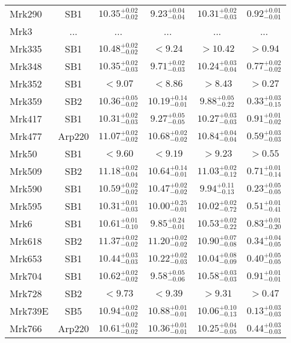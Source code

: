 \documentclass[onecolumn]{mn2e}
\begin{document}
{\begin{center}
\begin{longtable}{lccccc}
Mrk290 & SB1 & $10.35_{-0.02}^{+0.02}$ & $9.23_{-0.04}^{+0.04}$ & $10.31_{-0.03}^{+0.02}$ &$0.92_{-0.01}^{+0.01}$ \\
Mrk3 & ... & ... & ... & ... &... \\
Mrk335 & SB1 & $10.48_{-0.02}^{+0.02}$ & $<9.24$ & $>10.42$ &$>0.94$ \\
Mrk348 & SB1 & $10.35_{-0.03}^{+0.02}$ & $9.71_{-0.03}^{+0.02}$ & $10.24_{-0.04}^{+0.03}$ &$0.77_{-0.02}^{+0.02}$ \\
Mrk352 & SB1 & $<9.07$ & $<8.86$ & $>8.43$ &$>0.27$ \\
Mrk359 & SB2 & $10.36_{-0.02}^{+0.05}$ & $10.19_{-0.01}^{+0.14}$ & $9.88_{-0.22}^{+0.05}$ &$0.33_{-0.15}^{+0.03}$ \\
Mrk417 & SB1 & $10.31_{-0.03}^{+0.02}$ & $9.27_{-0.05}^{+0.05}$ & $10.27_{-0.03}^{+0.03}$ &$0.91_{-0.02}^{+0.01}$ \\
Mrk477 & Arp220 & $11.07_{-0.02}^{+0.02}$ & $10.68_{-0.02}^{+0.02}$ & $10.84_{-0.04}^{+0.04}$ &$0.59_{-0.03}^{+0.03}$ \\
Mrk50 & SB1 & $<9.60$ & $<9.19$ & $>9.23$ &$>0.55$ \\
Mrk509 & SB2 & $11.18_{-0.04}^{+0.02}$ & $10.64_{-0.01}^{+0.14}$ & $11.03_{-0.12}^{+0.02}$ &$0.71_{-0.14}^{+0.01}$ \\
Mrk590 & SB1 & $10.59_{-0.02}^{+0.02}$ & $10.47_{-0.02}^{+0.02}$ & $9.94_{-0.13}^{+0.11}$ &$0.23_{-0.05}^{+0.05}$ \\
Mrk595 & SB1 & $10.31_{-0.03}^{+0.01}$ & $10.00_{-0.01}^{+0.25}$ & $10.02_{-0.72}^{+0.02}$ &$0.51_{-0.41}^{+0.01}$ \\
Mrk6 & SB1 & $10.61_{-0.10}^{+0.01}$ & $9.85_{-0.01}^{+0.24}$ & $10.53_{-0.22}^{+0.02}$ &$0.83_{-0.20}^{+0.01}$ \\
Mrk618 & SB2 & $11.37_{-0.02}^{+0.02}$ & $11.20_{-0.02}^{+0.02}$ & $10.90_{-0.08}^{+0.07}$ &$0.34_{-0.05}^{+0.04}$ \\
Mrk653 & SB1 & $10.44_{-0.03}^{+0.03}$ & $10.22_{-0.03}^{+0.02}$ & $10.04_{-0.09}^{+0.08}$ &$0.40_{-0.05}^{+0.05}$ \\
Mrk704 & SB1 & $10.62_{-0.02}^{+0.02}$ & $9.58_{-0.06}^{+0.05}$ & $10.58_{-0.03}^{+0.03}$ &$0.91_{-0.01}^{+0.01}$ \\
Mrk728 & SB2 & $<9.73$ & $<9.39$ & $>9.31$ &$>0.47$ \\
Mrk739E & SB5 & $10.94_{-0.02}^{+0.02}$ & $10.88_{-0.01}^{+0.01}$ & $10.06_{-0.13}^{+0.10}$ &$0.13_{-0.03}^{+0.03}$ \\
Mrk766 & Arp220 & $10.61_{-0.02}^{+0.02}$ & $10.36_{-0.01}^{+0.01}$ & $10.25_{-0.05}^{+0.04}$ &$0.44_{-0.03}^{+0.03}$ \\

\end{longtable}
\end{center}}
\end{document}
